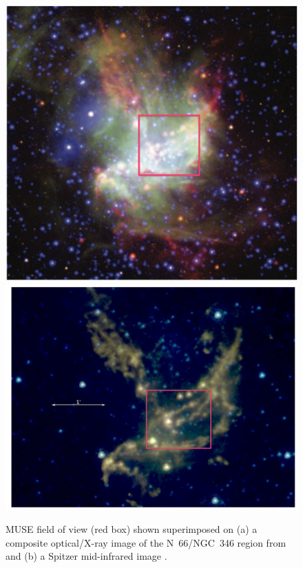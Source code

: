 \documentclass[twocolumn, times]{aastex631}
\begin{document}
\begin{figure}
  \centering
  \includegraphics[width=\linewidth]{figs/CleanShot-2021-05-19-gouliermis-fig01}
  \includegraphics[width=\linewidth]{figs/CleanShot-2021-05-19-whelan-fig01}
  \caption{MUSE field of view (red box)
    shown superimposed on (a) a composite optical/X-ray image of the N~66/NGC~346 region
    from \citet{Gouliermis:2008a} and (b) a Spitzer mid-infrared image \citep{Whelan:2013d}.
  }
  \label{fig:muse-fov}
\end{figure}
\end{document}
